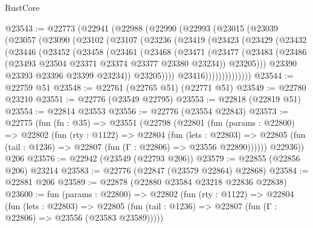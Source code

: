 \begin{lexlean}{RustCore}
\begin{coremodule}
@23543 := @22773
    (@22941
      (@22988
        (@22990
          (@22993
            (@23015
              (@23039
                (@23057
                  (@23090
                    (@23102
                      (@23107
                        (@23236
                          (@23419
                            (@23423
                              (@23429
                                (@23432
                                  (@23446
                                    (@23452
                                      (@23458
                                        (@23461
                                          (@23468
                                            (@23471
                                              (@23477
                                                (@23483
                                                  (@23486
                                                    (@23493
                                                      @23504
                                                      @23371
                                                      @23374
                                                      @23377
                                                      @23380
                                                      @23234))
                                                  @23205)))
                                            @23390
                                            @23393
                                            @23396
                                            @23399
                                            @23234))
                                        @23205))))
                                @23416))))))))))))))
@23544 := @22759 @51
@23548 := @22761 (@22765 @51) (@22771 @51)
@23549 := @22780 @23210
@23551 := @22776 (@23549 @22795)
@23553 := @22818 (@22819 @51)
@23554 := @22814 @23553
@23556 := @22776 (@23554 @22843)
@23573 := @22775
    (fun (fn : @35) =>
    @23551
      (@22798
        (@22801
          (fun (params : @22800) =>
          @22802
            (fun (rty : @1122) =>
            @22804
              (fun (lets : @22803) =>
              @22805 (fun (tail : @1236) => @22807 (fun (Γ : @22806) => @23556 @22890))))))
        @22936))
    @206
@23576 := @22942 (@23549 (@22793 @206))
@23579 := @22855 (@22856 @206) @23214
@23583 := @22776 (@22847 (@23579 @22864) @22868)
@23584 := @22881 @206
@23589 := @22878 (@22880 @23584 @23218 @22836 @22838)
@23600 := fun (params : @22800) =>
  @22802
    (fun (rty : @1122) =>
    @22804
      (fun (lets : @22803) =>
      @22805 (fun (tail : @1236) => @22807 (fun (Γ : @22806) => @23556 (@23583 @23589)))))

\end{coremodule}
\end{lexlean}
